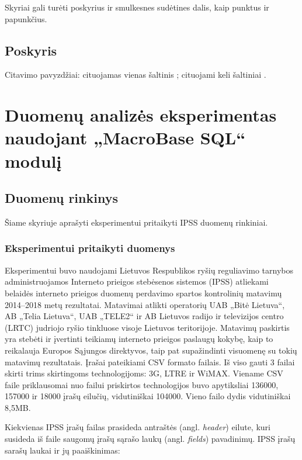 \documentclass{VUMIFPSbakalaurinis}
\begin{document}
Skyriai gali turėti poskyrius ir smulkesnes sudėtines dalis, kaip punktus ir
papunkčius.

\subsection{Poskyris}
Citavimo pavyzdžiai: cituojamas vienas šaltinis \cite{PvzStraipsnLt}; cituojami
keli šaltiniai \cite{PvzStraipsnEn, PvzKonfLt, PvzKonfEn, PvzKnygLt, PvzKnygEn,
	PvzElPubLt, PvzElPubEn, PvzMagistrLt, PvzPhdEn}.

\section{Duomenų analizės eksperimentas naudojant „MacroBase SQL“ modulį}

\subsection{Duomenų rinkinys}
Šiame skyriuje aprašyti eksperimentui pritaikyti IPSS duomenų rinkiniai.

\subsubsection{Eksperimentui pritaikyti duomenys}
Eksperimentui buvo naudojami Lietuvos Respublikos ryšių reguliavimo tarnybos administruojamos Interneto prieigos stebėsenos sistemos (IPSS) atliekami belaidės interneto prieigos duomenų perdavimo spartos kontrolinių matavimų 2014–2018 metų rezultatai. Matavimai atlikti operatorių UAB „Bitė Lietuva“, AB „Telia Lietuva“, UAB „TELE2“ ir AB Lietuvos radijo ir televizijos centro (LRTC) judriojo ryšio tinkluose visoje Lietuvos teritorijoje. Matavimų paskirtis yra stebėti ir įvertinti teikiamų interneto prieigos paslaugų kokybę, kaip to reikalauja Europos Sąjungos direktyvos, taip pat supažindinti visuomenę su tokių matavimų rezultatais. Įrašai pateikiami CSV formato failais. Iš viso gauti 3 failai skirti trims skirtingoms technologijoms: 3G, LTRE ir WiMAX. Viename CSV faile priklausomai nuo failui priskirtos technologijos buvo apytiksliai 136000, 157000 ir 18000 įrašų eilučių, vidutiniškai 104000. Vieno failo dydis vidutiniškai 8,5MB.

Kiekvienas IPSS įrašų failas prasideda antraštės (angl. \textit{header}) eilute, kuri susideda iš faile saugomų įrašų sąrašo laukų (angl. \textit{fields}) pavadinimų. IPSS įrašų sarašų laukai ir jų paaiškinimas:
\end{document}

